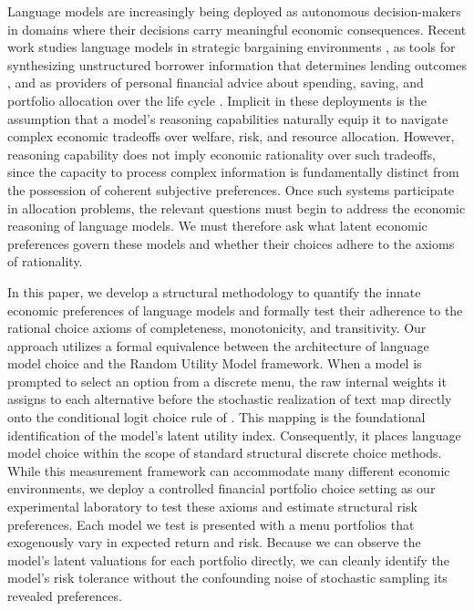 Language models are increasingly being deployed as autonomous decision-makers in domains where their decisions carry meaningful economic consequences. Recent work studies language models in strategic bargaining environments \citep{araujo2026how}, as tools for synthesizing unstructured borrower information that determines lending outcomes \citep{eisfeldt2024ai}, and as providers of personal financial advice about spending, saving, and portfolio allocation over the life cycle \citep{desilva2026ai}. Implicit in these deployments is the assumption that a model's reasoning capabilities naturally equip it to navigate complex economic tradeoffs over welfare, risk, and resource allocation. However, reasoning capability does not imply economic rationality over such tradeoffs, since the capacity to process complex information is fundamentally distinct from the possession of coherent subjective preferences. Once such systems participate in allocation problems, the relevant questions must begin to address the economic reasoning of language models. We must therefore ask what latent economic preferences govern these models and whether their choices adhere to the axioms of rationality.

In this paper, we develop a structural methodology to quantify the innate economic preferences of language models and formally test their adherence to the rational choice axioms of completeness, monotonicity, and transitivity. Our approach utilizes a formal equivalence between the architecture of language model choice and the Random Utility Model framework. When a model is prompted to select an option from a discrete menu, the raw internal weights it assigns to each alternative before the stochastic realization of text map directly onto the conditional logit choice rule of \cite{mcfadden1972conditional}. This mapping is the foundational identification of the model's latent utility index. Consequently, it places language model choice within the scope of standard structural discrete choice methods. While this measurement framework can accommodate many different economic environments, we deploy a controlled financial portfolio choice setting as our experimental laboratory to test these axioms and estimate structural risk preferences. Each model we test is presented with a menu portfolios that exogenously vary in expected return and risk. Because we can observe the model's latent valuations for each portfolio directly, we can cleanly identify the model's risk tolerance without the confounding noise of stochastic sampling its revealed preferences.

